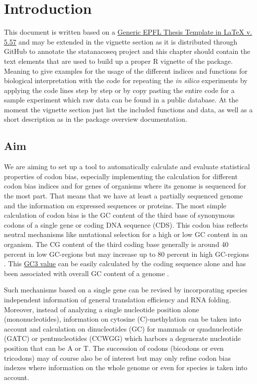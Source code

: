 \chapter*{Introduction}
This document is written based on a \href{http://phd.epfl.ch/thesistemplates}{Generic EPFL Thesis Template in LaTeX v. 5.57} and may be extended in the vignette section as it is distributed through GitHub to annotate the statanacoseq project and this chapter should contain the text elements that are used to build up a proper R vignette of the package. Meaning to give examples for the usage of the different indices and functions for biological interpretation with the code for repeating the \textit{in silico} experiments by applying the code lines step by step or by copy pasting the entire code for a sample experiment which raw data can be found in a public database. At the moment the vignette section just list the included functions and data, as well as a short description as in the package overview documentation.

\section{Aim}
We are aiming to set up a tool to automatically calculate and evaluate statistical properties of codon bias, especially implementing the calculation for different codon bias indices and for genes of organisms where its genome is sequenced for the most part. That means that we have at least a partially sequenced genome and the information on expressed sequences or proteins.
The most simple calculation of codon bias is the GC content of the third base of synonymous codons of a single gene or coding DNA sequence (CDS). This codon bias reflects neutral mechanisms like mutational selection for a high or low GC content in an organism. The CG content of the third coding base generally is around 40 percent in low GC-regions but may increase up to 80 percent in high GC-regions \cite{Galtier2001}. This \hyperlink{function:G3C}{GC3 value} can be easily calculated by the coding sequence alone and has been associated with overall GC content of a genome \cite{Muto1987}.

Such mechanisms based on a single gene can be revised by incorporating species independent information of general translation efficiency and RNA folding. Moreover, instead of analyzing a single nucleotide position alone (mononucleotides), information on cytosine (C)-methylation can be taken into account and calculation on dinucleotides (GC) for mammals or quadnucleotide (GATC) or pentnucleotides (CCWGG) which harbors a degenerate nucleotide position that can be A or T. The succession of codons (bicodons or even tricodons) may of course also be of interest but may only refine codon bias indexes where information on the whole genome or even for species is taken into account.

